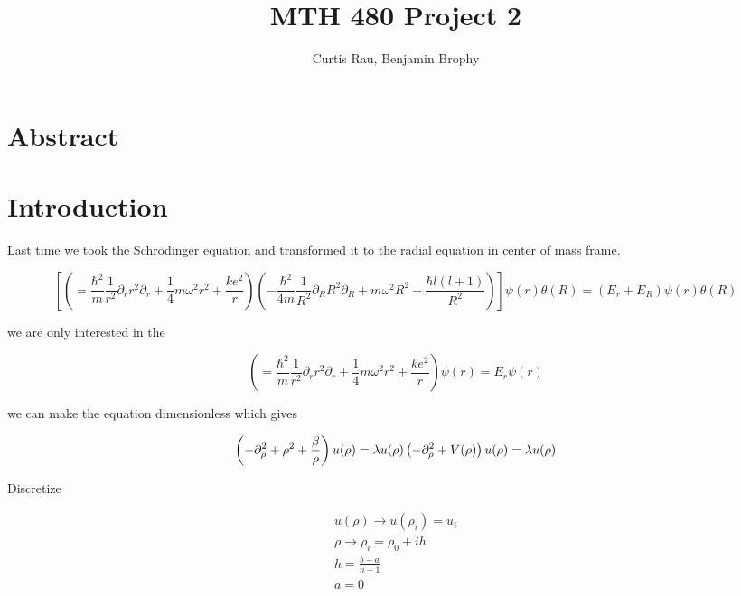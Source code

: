 \documentclass{article}
\begin{document}
	\title{MTH 480 Project 2}
	\author{Curtis Rau, Benjamin Brophy}
	\maketitle

\section{Abstract}

\section{Introduction}

Last time we took the Schr\"{o}dinger equation and transformed it to the radial equation in center of mass frame.

\begin{equation}
	\left[ \left( = \frac{\hbar^2}{m} \frac{1}{r^2} \partial_r r^2 \partial_r + \frac{1}{4} m \omega^2 r^2 + \frac{k e^2}{r} \right) \left( - \frac{\hbar^2}{4m} \frac{1}{R^2} \partial_R R^2 \partial_R + m\omega^2 R^2 + \frac{\hbar l(l+1)}{R^2} \right) \right] \psi (r) \theta (R)  = (E_r + E_R) \psi (r) \theta (R)
\end{equation}

we are only interested in the 

\begin{equation}
\left( = \frac{\hbar^2}{m} \frac{1}{r^2} \partial_r r^2 \partial_r + \frac{1}{4} m \omega^2 r^2 + \frac{k e^2}{r} \right) \psi (r)  = E_r \psi (r)
\end{equation}

we can make the equation dimensionless which gives

\begin{equation}
\left( - \partial_\rho^2 + \rho^2 + \frac{\beta}{\rho} \right) u ( \rho ) = \lambda u(\rho ) \\
\left( - \partial_\rho^2 + V (\rho ) \right) u ( \rho ) = \lambda u(\rho )
\end{equation}

Discretize

\begin{equation}
\begin{aligned}
	u(\rho) \to u(\rho_i) = u_i \\
	\rho \to \rho_i = \rho_0 + i h \\
	h = \frac{b-a}{n+1} \\
	a = 0
\end{aligned}
\end{equation}
\end{document}
